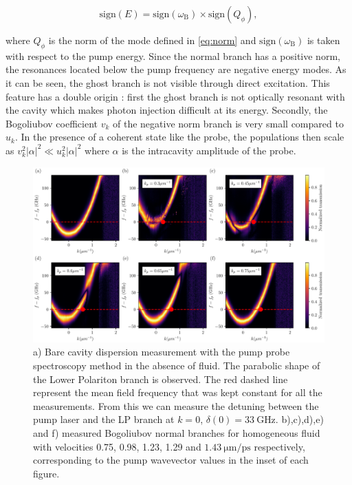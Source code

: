  \begin{equation}
    \mathrm{sign}(E)=\mathrm{sign}(\omega_\mathrm{B})\times \mathrm{sign}(Q_{\phi}),
 \end{equation}
 
where $Q_{\phi}$ is the norm of the mode defined in \autoref{eq:norm} and $\mathrm{sign}(\omega_\mathrm{B})$ is taken with respect to the pump energy. Since the normal branch has a positive norm, the resonances located
below the pump frequency are negative energy modes. As it can be seen, the ghost branch is not visible through direct excitation. This feature has a double origin : first the ghost branch is not optically resonant with the cavity which makes photon injection difficult at its energy. Secondly,
the Bogoliubov coefficient $v_k$ of the negative norm branch is very small compared to $u_k$.  In the presence of
a coherent state like the probe, the populations then scale as $v_k^2 |\alpha|^2\ll u_k^2|\alpha|^2$ where $\alpha$ is the intracavity amplitude of the probe. 

\begin{figure}[h!]
    \centering
    \includegraphics[width=1\textwidth]{chap_custom_st/fig/homogeneous_doppler.pdf}
    \caption{a) Bare cavity dispersion measurement with the pump probe spectroscopy method in the absence of fluid. 
    The parabolic shape of the Lower Polariton branch is observed.  
    The red dashed line represent the mean field frequency that was kept constant for all the measurements. 
    From this we can measure the detuning between the pump laser and the LP branch at $k=0$,
     $\delta(0) = \SI{33}{\giga\hertz}$. b),c),d),e) and f) measured Bogoliubov normal branches for homogeneous fluid with velocities 0.75, 0.98, 1.23, 1.29 and $\SI{1.43}{\micro \meter \per \pico \second}$ respectively, corresponding 
    to the pump wavevector values in the inset of each figure.}
     
    \label{fig:homogeneous_fluid_bogo}
\end{figure}

